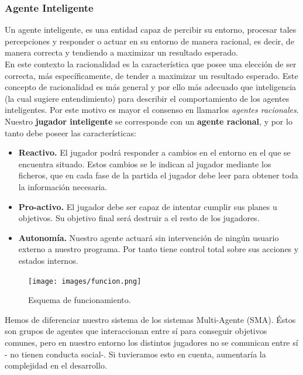 \documentclass[a4paper,12pt,oneside]{book}
\begin{document}
\subsubsection{Agente Inteligente}
Un agente inteligente, es una entidad capaz de percibir su entorno,
procesar tales percepciones y responder o actuar en su entorno de
manera racional, es decir, de manera correcta y tendiendo a maximizar
un resultado esperado.\\

En este contexto la racionalidad es la característica que posee una
elección de ser correcta, más específicamente, de tender a maximizar
un resultado esperado. Este concepto de racionalidad es más general y
por ello más adecuado que inteligencia (la cual sugiere entendimiento)
para describir el comportamiento de los agentes inteligentes. Por este
motivo es mayor el consenso en llamarlos {\it agentes racionales}.\\

Nuestro {\bf jugador inteligente} se corresponde con un {\bf agente racional}, y
por lo tanto debe poseer las características:
\begin{itemize}
\item {\bf Reactivo.} El jugador podrá responder a cambios en el
  entorno en el que se encuentra situado. Estos cambios se le indican
  al jugador mediante los ficheros, que en cada fase de la partida el
  jugador debe leer para obtener toda la información necesaria.
\item {\bf Pro-activo.} El jugador debe ser capaz de intentar cumplir
  sus planes u objetivos. Su objetivo final será destruir a el resto
  de los jugadores.
\item {\bf Autonomía.} Nuestro agente actuará sin intervención de
  ningún usuario externo a nuestro programa. Por tanto tiene control
  total sobre sus acciones y estados internos.
\end{itemize}

\begin{figure}[!h]
  \centering
  \texttt{[image: images/funcion.png]}
  \caption{Esquema de funcionamiento.}
\end{figure}
Hemos de diferenciar nuestro sistema de los sistemas Multi-Agente
(SMA). Éstos son grupos de agentes que interaccionan entre sí para
conseguir objetivos comunes, pero en nuestro entorno los distintos
jugadores no se comunican entre sí - no tienen conducta social-. Si
tuvieramos esto en cuenta, aumentaría la complejidad en el
desarrollo.\\
\end{document}
